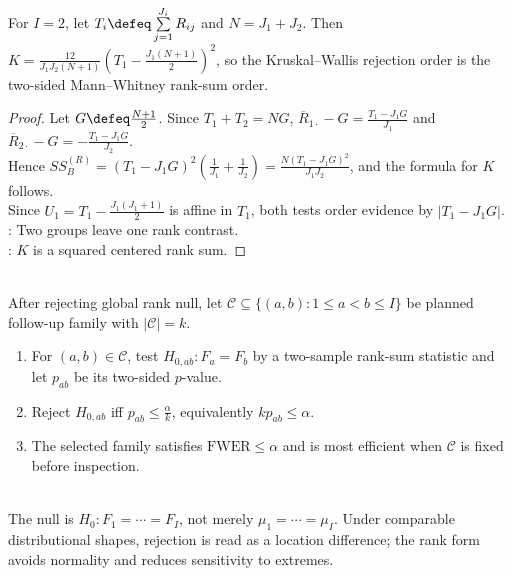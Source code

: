\begin{corollary} \label{cor:kruskal-wallis-two-groups-mann-whitney} \\
For $I=2$, let $T_i\defeq\sum\limits_{j=1}^{J_i}R_{ij}$ and $N=J_1+J_2$. Then $K=\frac{12}{J_1J_2(N+1)}\left(T_1-\frac{J_1(N+1)}{2}\right)^2$, so the Kruskal--Wallis rejection order is the two-sided Mann--Whitney rank-sum order.
\begin{proof} Let $G\defeq\frac{N+1}{2}$. Since $T_1+T_2=NG$, $\overline{R}_{1\cdot}-G=\frac{T_1-J_1G}{J_1}$ and $\overline{R}_{2\cdot}-G=-\frac{T_1-J_1G}{J_2}$.\\
Hence $SS_B^{(R)}=(T_1-J_1G)^2(\frac{1}{J_1}+\frac{1}{J_2})=\frac{N(T_1-J_1G)^2}{J_1J_2}$, and the formula for $K$ follows.\\
Since $U_1=T_1-\frac{J_1(J_1+1)}{2}$ is affine in $T_1$, both tests order evidence by $|T_1-J_1G|$.\\
: Two groups leave one rank contrast.\\
: $K$ is a squared centered rank sum.
\end{proof}
\end{corollary}

\begin{method} \label{meth:rank-based-multiple-comparisons} \\
After rejecting global rank null, let $\mathcal{C}\subseteq\{(a,b):1\leq a<b\leq I\}$ be planned follow-up family with $|\mathcal{C}|=k$.
\begin{enumerate}[label=(\roman*)]
\setlength{\itemsep}{0pt}
\item For $(a,b)\in\mathcal{C}$, test $H_{0,ab}:F_a=F_b$ by a two-sample rank-sum statistic and let $p_{ab}$ be its two-sided $p$-value.
\item Reject $H_{0,ab}$ iff $p_{ab}\leq\frac{\alpha}{k}$, equivalently $kp_{ab}\leq\alpha$.
\item The selected family satisfies $\mathrm{FWER}\leq\alpha$ and is most efficient when $\mathcal{C}$ is fixed before inspection.
\end{enumerate}
\end{method}

\begin{remark} \label{rem:kruskal-wallis-scope} \\
The null is $H_0:F_1=\cdots=F_I$, not merely $\mu_1=\cdots=\mu_I$. Under comparable distributional shapes, rejection is read as a location difference; the rank form avoids normality and reduces sensitivity to extremes.
\end{remark}
